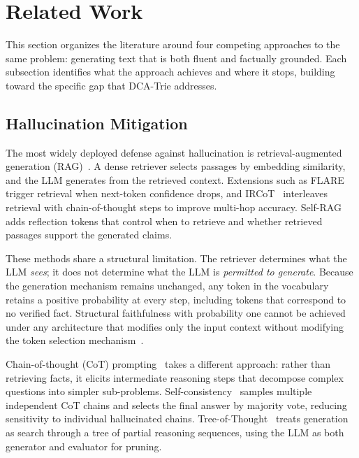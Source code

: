 
\section{Related Work}
\label{sec:related}

This section organizes the literature around four competing approaches to the same
problem: generating text that is both fluent and factually grounded. Each subsection
identifies what the approach achieves and where it stops, building toward the specific
gap that DCA-Trie addresses.

\subsection{Hallucination Mitigation}
\label{sec:related:hallucination}

The most widely deployed defense against hallucination is retrieval-augmented generation
(RAG)~\citep{lewis2020rag}. A dense retriever selects passages by embedding similarity,
and the LLM generates from the retrieved context. Extensions such as
FLARE~\citep{jiang2023flare} trigger retrieval when next-token confidence drops, and
IRCoT~\citep{trivedi2022ircot} interleaves retrieval with chain-of-thought steps to
improve multi-hop accuracy. Self-RAG~\citep{asai2024selfrag} adds reflection tokens
that control when to retrieve and whether retrieved passages support the generated
claims.

These methods share a structural limitation. The retriever determines what the LLM
\textit{sees}; it does not determine what the LLM is \textit{permitted to generate}.
Because the generation mechanism remains unchanged, any token in the vocabulary retains
a positive probability at every step, including tokens that correspond to no verified
fact. Structural faithfulness with probability one cannot be achieved under any
architecture that modifies only the input context without modifying the token selection
mechanism~\citep{geng2023grammarconstrained, luo2025-graph-constrained-reasoning}.

Chain-of-thought (CoT) prompting~\citep{wei2022cot} takes a different approach:
rather than retrieving facts, it elicits intermediate reasoning steps that decompose
complex questions into simpler sub-problems. Self-consistency~\citep{wang2023selfconsistency}
samples multiple independent CoT chains and selects the final answer by majority vote,
reducing sensitivity to individual hallucinated chains. Tree-of-Thought~\citep{yao2023-tree-of-thought}
treats generation as search through a tree of partial reasoning sequences, using the LLM
as both generator and evaluator for pruning.

